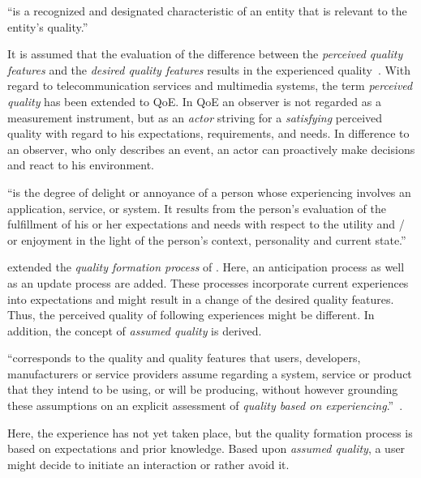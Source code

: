 \begin{definition}
``is a recognized and designated characteristic of an entity that is relevant to the entity's quality.''~\citep[][p.~17]{jekosch_voice_2005}
\end{definition}

It is assumed that the evaluation of the difference between the \emph{perceived quality features} and the \emph{desired quality features} results in the experienced quality~\citep[p.~23]{raake_quality_2014}.
With regard to telecommunication services and multimedia systems, the term \emph{perceived quality} has been extended to \acf{QoE}.
In \ac{QoE} an observer is not regarded as a measurement instrument, but as an \emph{actor} striving for a \emph{satisfying} perceived quality with regard to his expectations, requirements,  and needs.\label{actor} 
In difference to an observer, who only describes an event, an actor can proactively make decisions and react to his environment.  

\begin{definition}
``is the degree of delight or annoyance of a person whose experiencing involves an application, service, or system.
It results from the person’s evaluation of the fulfillment of his or her expectations and needs with respect to the utility and / or enjoyment in the light of the person’s context, personality and current state.''~\citep[][p.~19]{raake_quality_2014}
\end{definition}

\citet{raake_quality_2014} extended the \emph{quality formation process} of \citet{jekosch_voice_2005}.
Here, an anticipation process as well as an update process are added.
These processes incorporate current experiences into expectations and might result in a change of the desired quality features.
Thus, the perceived quality of following experiences might be different.
In addition, the concept of \emph{assumed quality} is derived.
\begin{definition}\label{def:assumedquality}
``corresponds to the quality and quality features that users, developers, manufacturers or service providers assume regarding a system, service or product that they intend to be using, or will be producing, without however grounding these assumptions on an explicit assessment of \textit{quality based on experiencing}.''~\citep[][p.~17]{raake_quality_2014}.
\end{definition}
Here, the experience has not yet taken place, but the quality formation process is based on expectations and prior knowledge.
Based upon \emph{assumed quality}, a user might decide to initiate an interaction or rather avoid it.

